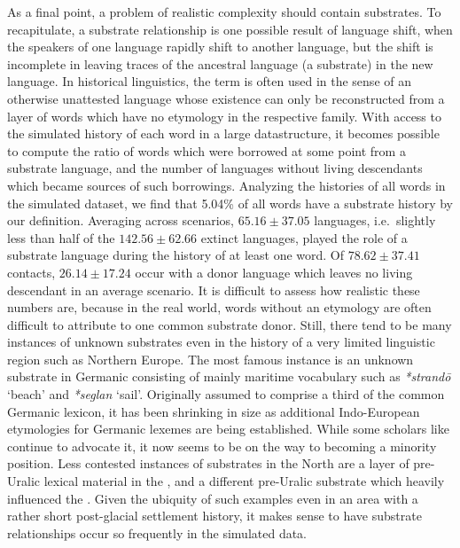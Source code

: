 As a final point, a problem of realistic complexity should contain substrates. To recapitulate, a substrate relationship is one possible result of language shift, when the speakers of one language rapidly shift to another language, but the shift is incomplete in leaving traces of the ancestral language (a substrate) in the new language. In historical linguistics, the term \textit{} is often used in the sense of an otherwise unattested language whose existence can only be reconstructed from a layer of words which have no etymology in the respective family. With access to the simulated history of each word in a large datastructure, it becomes possible to compute the ratio of words which were borrowed at some point from a substrate language, and the number of languages without living descendants which became sources of such borrowings. Analyzing the histories of all words in the simulated dataset, we find that 5.04\% of all words have a substrate history by our definition. Averaging 
across scenarios, $65.16 \pm 37.05$ languages, i.e.\ slightly less than half of the $142.56 \pm 62.66$ extinct languages, played the role of a substrate language during the history of at least one word. Of $78.62 \pm 37.41$ contacts, $26.14 \pm 17.24$ occur with a donor language which leaves no living descendant in an average scenario. It is difficult to assess how realistic these numbers are, because in the real world, words without an etymology are often difficult to attribute to one common substrate donor. Still, there tend to be many instances of unknown substrates even in the history of a very limited linguistic region such as Northern Europe. The most famous instance is an unknown substrate in Germanic consisting of mainly maritime vocabulary such as \textit{*strand\={o}} `beach' and \textit{*seglan} `sail'. Originally assumed to comprise a third of the common Germanic lexicon, it has been shrinking in size as additional Indo-European etymologies for Germanic lexemes are being 
established. While some scholars like \cite{hawkins1990} continue to advocate it, it now seems to be on the way to becoming a minority position. Less contested instances of substrates in the North are a layer of pre-Uralic lexical material in the  \citep{aikio2004}, and a different pre-Uralic substrate which heavily influenced the  \citep[e.g.][]{helimski1998}. Given the ubiquity of such examples even in an area with a rather short post-glacial settlement history, it makes sense to have substrate relationships occur so frequently in the simulated data.

